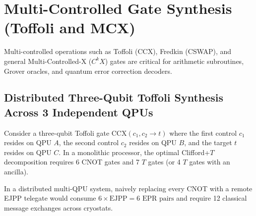 \section{Multi-Controlled Gate Synthesis (Toffoli and MCX)}
\label{sec:mcx_synthesis}

Multi-controlled operations such as Toffoli (CCX), Fredkin (CSWAP), and general Multi-Controlled-X ($C^k X$) gates are critical for arithmetic subroutines, Grover oracles, and quantum error correction decoders.

\subsection{Distributed Three-Qubit Toffoli Synthesis Across 3 Independent QPUs}
\label{sec:distributed_3q_toffoli}

Consider a three-qubit Toffoli gate $\text{CCX}(c_1, c_2 \to t)$ where the first control $c_1$ resides on QPU $A$, the second control $c_2$ resides on QPU $B$, and the target $t$ resides on QPU $C$. In a monolithic processor, the optimal Clifford+$T$ decomposition requires 6 CNOT gates and 7 $T$ gates (or 4 $T$ gates with an ancilla). 

In a distributed multi-QPU system, naively replacing every CNOT with a remote EJPP telegate would consume $6\times \text{EJPP} = 6\text{ EPR pairs}$ and require 12 classical message exchanges across cryostats.

